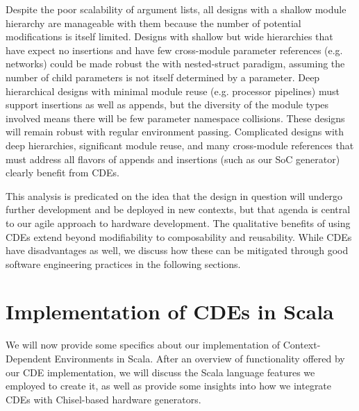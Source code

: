 Despite the poor scalability of argument lists, all designs with a shallow module hierarchy are manageable with them because the number of potential modifications is itself limited. 
Designs with shallow but wide hierarchies that have expect no insertions and have few cross-module parameter references (e.g. networks) could be made robust the with nested-struct paradigm,
assuming the number of child parameters is not itself determined by a parameter.
Deep hierarchical designs with minimal module reuse (e.g. processor pipelines) must support insertions as well as appends, but the diversity of the module types involved means there will be few parameter namespace collisions. These designs will remain robust with regular environment passing.
Complicated designs with deep hierarchies, significant module reuse, and many cross-module references that must address all flavors of appends and insertions (such as our SoC generator) clearly benefit from CDEs.

This analysis is predicated on the idea that the design in question will undergo further development and be deployed in new contexts,
but that agenda is central to our agile approach to hardware development.
The qualitative benefits of using CDEs extend beyond modifiability to composability and reusability.
While CDEs have disadvantages as well, we discuss how these can be mitigated through good software engineering practices in the following sections.

\section{Implementation of CDEs in Scala}
\label{sec:impl}

We will now provide some specifics about our implementation of Context-Dependent Environments in Scala.
After an overview of functionality offered by our CDE implementation, we will discuss the Scala language features we employed to create it,
as well as provide some insights into how we integrate CDEs with Chisel-based hardware generators.


